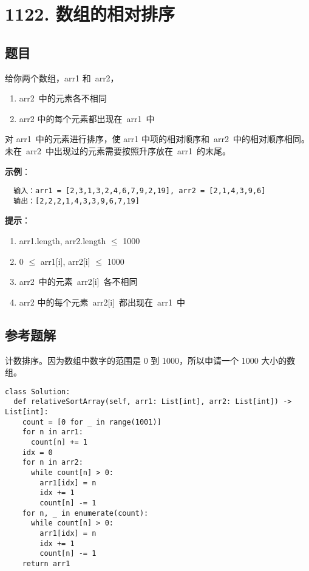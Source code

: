 \newpage
\section{1122. 数组的相对排序}
\label{leetcode:1122}

\subsection{题目}

给你两个数组，arr1 和 arr2，

\begin{enumerate}
  \item arr2 中的元素各不相同
  \item arr2 中的每个元素都出现在 arr1 中
\end{enumerate}

对 arr1 中的元素进行排序，使 arr1 中项的相对顺序和 arr2 中的相对顺序相同。
未在 arr2 中出现过的元素需要按照升序放在 arr1 的末尾。

\textbf{示例}：

\begin{verbatim}
  输入：arr1 = [2,3,1,3,2,4,6,7,9,2,19], arr2 = [2,1,4,3,9,6]
  输出：[2,2,2,1,4,3,3,9,6,7,19]
\end{verbatim}

\textbf{提示}：

\begin{enumerate}
  \item arr1.length, arr2.length $\leq$ 1000
  \item 0 $\leq$ arr1[i], arr2[i] $\leq$ 1000
  \item arr2 中的元素 arr2[i] 各不相同
  \item arr2 中的每个元素 arr2[i] 都出现在 arr1 中
\end{enumerate}

\subsection{参考题解}

计数排序。因为数组中数字的范围是 0 到 1000，所以申请一个 1000 大小的数组。

\begin{verbatim}
class Solution:
  def relativeSortArray(self, arr1: List[int], arr2: List[int]) -> List[int]:
    count = [0 for _ in range(1001)]
    for n in arr1:
      count[n] += 1
    idx = 0
    for n in arr2:
      while count[n] > 0:
        arr1[idx] = n
        idx += 1
        count[n] -= 1
    for n, _ in enumerate(count):
      while count[n] > 0:
        arr1[idx] = n
        idx += 1
        count[n] -= 1
    return arr1
\end{verbatim}
